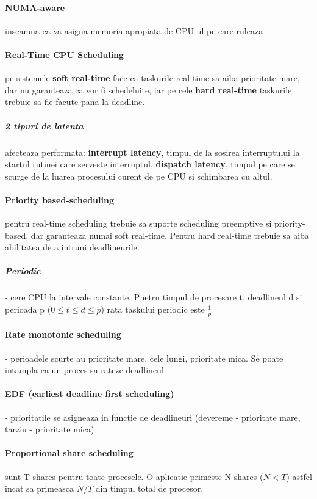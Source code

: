 \documentclass{article}
\begin{document}
\paragraph*{NUMA-aware} inseamna ca va asigna memoria apropiata de CPU-ul pe care ruleaza

\paragraph*{Real-Time CPU Scheduling} pe sistemele \textbf{soft real-time} face ca taskurile real-time sa aiba prioritate mare, dar nu garanteaza ca vor fi schedeluite, iar pe cele \textbf{hard real-time} taskurile trebuie sa fie facute pana la deadline.
\subparagraph*{2 tipuri de latenta} afecteaza performata: \textbf{interrupt latency}, timpul de la sosirea interruptului la startul rutinei care serveste interruptul, \textbf{dispatch latency}, timpul pe care se scurge de la luarea procesului curent de pe CPU si schimbarea cu altul.

\paragraph*{Priority based-scheduling} pentru real-time scheduling trebuie sa suporte scheduling preemptive si priority-based, dar garanteaza numai soft real-time. Pentru hard real-time trebuie sa aiba abilitatea de a intruni deadlineurile.
\subparagraph*{Periodic} - cere CPU la intervale constante. Pnetru timpul de procesare t, deadlineul d si perioada p ($0\leq t \leq d \leq p$) rata taskului periodic este $\frac{1}{p}$

\paragraph*{Rate monotonic scheduling} - perioadele scurte au prioritate mare, cele lungi, prioritate mica. Se poate intampla ca un proces sa rateze deadlineul.
\paragraph*{EDF (earliest deadline first scheduling)} - prioritatile se asigneaza in functie de deadlineuri (devereme - prioritate mare, tarziu - prioritate mica)
\paragraph*{Proportional share scheduling} sunt T shares pentru toate procesele. O aplicatie primeste N shares ($N < T$) astfel incat sa primeasca $N/T$ din timpul total de procesor.
\end{document}
